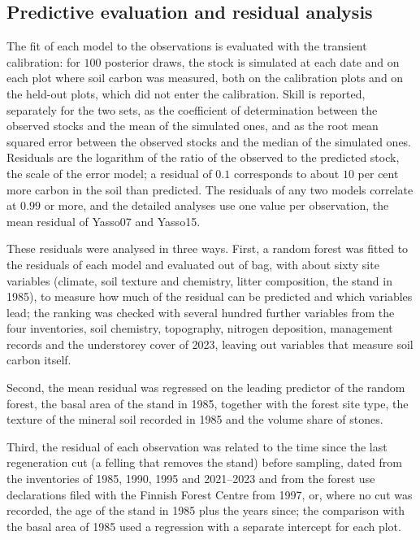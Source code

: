 \documentclass[11pt]{article}
\begin{document}
\subsection{Predictive evaluation and residual analysis}\label{sec:residuals_methods}

The fit of each model to the observations is evaluated with the transient calibration: for $100$ posterior draws, the stock is simulated at each date and on each plot where soil carbon was measured, both on the calibration plots and on the held-out plots, which did not enter the calibration. Skill is reported, separately for the two sets, as the coefficient of determination between the observed stocks and the mean of the simulated ones, and as the root mean squared error between the observed stocks and the median of the simulated ones.
Residuals are the logarithm of the ratio of the observed to the predicted stock, the scale of the error model; a residual of $0.1$ corresponds to about $10$ per cent more carbon in the soil than predicted. The
residuals of any two models correlate at $0.99$ or more, and the detailed analyses use one value
per observation, the mean residual of Yasso07 and Yasso15.

These residuals were analysed in three ways. 
First, a random forest was fitted to the residuals of each model and
evaluated out of bag, with about sixty site variables (climate, soil texture and chemistry, litter
composition, the stand in 1985), to measure how much of the residual can be predicted and which
variables lead; the ranking was checked with several hundred further variables from the four
inventories, soil chemistry, topography, nitrogen deposition, management records and the
understorey cover of 2023, leaving out variables that measure soil carbon itself. 

Second, the mean
residual was regressed on the leading predictor of the random forest, the basal area of the stand in 1985, together with the
forest site type, the texture of the mineral soil recorded in 1985 and the volume share of stones.

Third, the residual of each observation was related to the time since the last regeneration cut (a
felling that removes the stand) before sampling, dated from the inventories of 1985, 1990, 1995
and 2021--2023 and from the forest use declarations filed with the Finnish Forest Centre from 1997,
or, where no cut was recorded, the age of the stand in 1985 plus the years since; the comparison
with the basal area of 1985 used a regression with a separate intercept for each plot.
\end{document}
